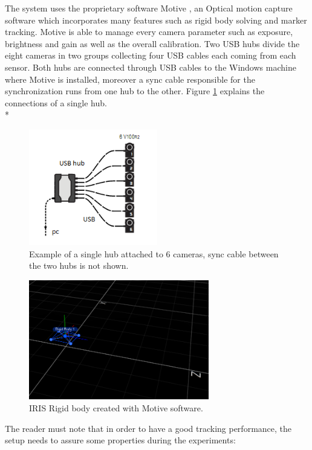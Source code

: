 The system uses the proprietary software Motive \cite{OptiT}, an Optical motion capture software which incorporates many features such as rigid body solving and marker tracking. Motive is able to manage every camera parameter such as exposure, brightness and gain as well as the overall calibration.
Two USB hubs divide the eight cameras in two groups collecting four USB cables each coming from each sensor. Both hubs are connected through USB cables to the Windows machine where Motive is installed, moreover a sync cable responsible for the synchronization runs from one hub to the other.
Figure \ref{figure:hub} explains the connections of a single hub.
\\*

\begin{figure}[H]
\centering
 \includegraphics[width=0.5\textwidth]{HUB.png}
 \caption[Single hub connection]{Example of a single hub attached to 6 cameras, sync cable between the two hubs is not shown.}
 \label{figure:hub}
\end{figure}

\begin{figure}[h]
\centering
 \includegraphics[width=0.7\textwidth]{motiv_iris.PNG}
 \caption[IRIS Rigid body]{IRIS Rigid body created with Motive software.}
 \label{figure:motivescreen}
\end{figure}
\noindent
The reader must note that in order to have a good tracking performance, the setup needs to assure some properties during the experiments:

